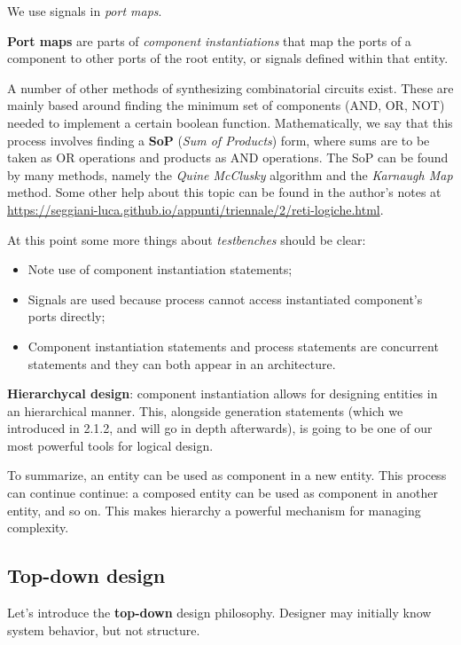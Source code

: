 \documentclass[a4paper,11pt]{article}
\begin{document}
We use signals in \textit{port maps}.

\textbf{\textsf{Port maps}} are parts of \textit{component instantiations} that map the ports of a component to other ports of the root entity, or signals defined within that entity.

A number of other methods of synthesizing combinatorial circuits exist.
These are mainly based around finding the minimum set of components (AND, OR, NOT) needed to implement a certain boolean function.
Mathematically, we say that this process involves finding a \textbf{SoP} (\textit{Sum of Products}) form, where sums are to be taken as OR operations and products as AND operations.
The SoP can be found by many methods, namely the \textit{Quine McClusky} algorithm and the \textit{Karnaugh Map} method.
Some other help about this topic can be found in the author's notes at \url{https://seggiani-luca.github.io/appunti/triennale/2/reti-logiche.html}.

\par\smallskip

At this point some more things about \textit{testbenches} should be clear:
\begin{itemize}
	\item Note use of component instantiation statements;
	\item Signals are used because process cannot access instantiated component's ports directly;
	\item Component instantiation statements and process statements are concurrent statements and they can both appear in an architecture.
\end{itemize}

\textbf{\textsf{Hierarchycal design}}: component instantiation allows for designing entities in an hierarchical manner.
This, alongside generation statements (which we introduced in 2.1.2, and will go in depth afterwards), is going to be one of our most powerful tools for logical design.

To summarize, an entity can be used as component in a new entity.
This process can continue continue: a composed entity can be used as component in another entity, and so on.
This makes hierarchy a powerful mechanism for managing complexity.

\subsection{Top-down design}

Let's introduce the \textbf{top-down} design philosophy.
Designer may initially know system behavior, but not structure.
\end{document}
